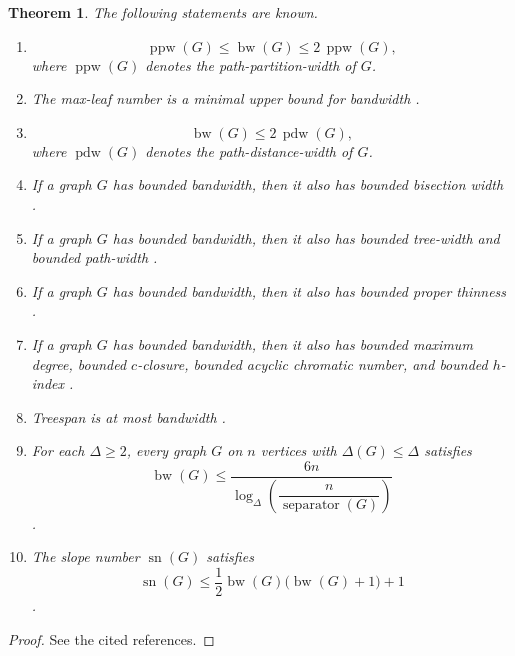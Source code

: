 \documentclass[10pt]{book}
\newtheorem{theorem}{Theorem}[section]
\theoremstyle{definition}
\begin{document}
\begin{theorem}
The following statements are known.
\begin{enumerate}
    \item
    \[
    \operatorname{ppw}(G)\leq \operatorname{bw}(G)\leq 2\,\operatorname{ppw}(G),
    \]
    where \(\operatorname{ppw}(G)\) denotes the path-partition-width of \(G\).

    \item The max-leaf number is a minimal upper bound for bandwidth \cite{341}.

    \item
    \[
    \operatorname{bw}(G)\leq 2\,\operatorname{pdw}(G),
    \]
    where \(\operatorname{pdw}(G)\) denotes the path-distance-width of \(G\).

    \item If a graph \(G\) has bounded bandwidth, then it also has bounded bisection width \cite{341}.

    \item If a graph \(G\) has bounded bandwidth, then it also has bounded tree-width and bounded path-width \cite{313}.

    \item If a graph \(G\) has bounded bandwidth, then it also has bounded proper thinness \cite{bonomo2021intersection}.

    \item If a graph \(G\) has bounded bandwidth, then it also has bounded maximum degree, bounded \(c\)-closure, bounded acyclic chromatic number, and bounded \(h\)-index \cite{341,421,422}.

    \item Treespan is at most bandwidth \cite{352}.

    \item For each \(\Delta\geq 2\), every graph \(G\) on \(n\) vertices with \(\Delta(G)\leq \Delta\) satisfies
    \[
    \operatorname{bw}(G)\leq
    \frac{6n}{\log_{\Delta}\!\left(\dfrac{n}{\operatorname{separator}(G)}\right)}
    \]
        \cite{bottcher2010bandwidth}.

    \item The slope number \(\operatorname{sn}(G)\) satisfies
    \[
    \operatorname{sn}(G)\leq \frac{1}{2}\operatorname{bw}(G)\bigl(\operatorname{bw}(G)+1\bigr)+1
    \]
        \cite{dujmovic2007graph}.
\end{enumerate}
\end{theorem}

\begin{proof}
See the cited references.
\end{proof}
\end{document}
